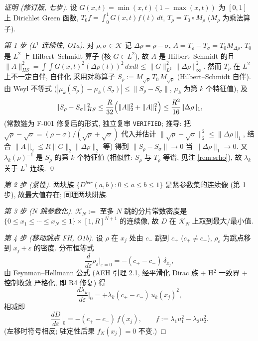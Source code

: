\documentclass[UTF8]{ctexart}
\begin{document}
\begin{proof}[证明 (修订版, 七步)]
设 $G(x,t)=\min(x,t)(1-\max(x,t))$ 为 $[0,1]$ 上 Dirichlet Green 函数,
$T_0 f=\int_0^1 G(x,t)f(t)\,dt$, $T_\rho=T_0\circ M_\rho$ ($M_\rho$ 为乘法算子).

\emph{第 1 步 (L$^1$ 连续性, O1a).} 对 $\rho,\sigma\in\mathcal K$ 记
$\Delta\rho=\rho-\sigma$, $A=T_\rho-T_\sigma=T_0M_{\Delta\rho}$. $T_0$ 是 $L^2$ 上
Hilbert--Schmidt 算子 (核 $G\in L^2$), 故 $A$ 是 Hilbert--Schmidt 的且
$\|A\|_{HS}^2=\int\!\!\int G(x,t)^2(\Delta\rho(t))^2\,dxdt\le
\|G\|_{L^2}^2\|\Delta\rho\|_\infty^2$. 然而 $T_\rho$ 在 $L^2$ 上不一定自伴, 自伴化
采用对称算子 $S_\rho:=M_{\sqrt\rho}\,T_0\,M_{\sqrt\rho}$ (Hilbert--Schmidt 自伴).
由 Weyl 不等式 ($|\mu_k(S_\rho)-\mu_k(S_\sigma)|\le\|S_\rho-S_\sigma\|$, $\mu_k$ 为第
$k$ 个特征值), 及
\begin{equation}
	\|S_\rho-S_\sigma\|_{HS}^2\le
	\frac{R}{32}\Bigl(\|A\|_2^2+\|A\|_1^2\Bigr)\le\frac{R^2}{16}\|\Delta\rho\|_1,
\end{equation}
(常数链为 F-001 修复后的形式, 独立复审 \texttt{VERIFIED}; 推导: 把
$\sqrt\rho-\sqrt\sigma=(\rho-\sigma)/(\sqrt\rho+\sqrt\sigma)$ 代入并估计
$\|\sqrt\rho-\sqrt\sigma\|_2^2\le\|\Delta\rho\|_1$, 结合 $\|A\|_2\le R\|G\|_2\|\Delta\rho\|_2$
等) 得到 $\|S_\rho-S_\sigma\|\to 0$ 当 $\|\Delta\rho\|_1\to0$. 又 $\lambda_k(\rho)^{-1}$
是 $S_\rho$ 的第 $k$ 个特征值 (相似性: $S_\rho$ 与 $T_\rho$ 等谱, 见注 \ref{rem:srho}),
故 $\lambda_k$ 关于 $L^1$ 连续. \qed

\emph{第 2 步 (紧性).} 两块族 $\{D^{bar}(a,b):0\le a\le b\le1\}$ 是紧参数集的连续像
(第 1 步), 故最大值存在; 同理两块阱族.

\emph{第 3 步 ($N$ 跳参数化).} $\mathcal K_N:=$ 至多 $N$ 跳的分片常数密度是
$\{0\le x_1\le\cdots\le x_N\le1\}\times[1,R]^{N+1}$ 的连续像, 故 $D$ 在 $\mathcal K_N$
上取到最大/最小值.

\emph{第 4 步 (移动跳点 FH, O1b).} 设 $\rho$ 在 $x_j$ 处由 $c_-$ 跳到 $c_+$
($c_+\neq c_-$), $\rho_\varepsilon$ 为跳点移到 $x_j+\varepsilon$ 的密度. 分布恒等式
\begin{equation}
	\frac{d}{d\varepsilon}\rho_\varepsilon\Big|_{\varepsilon=0}
	=-(c_+-c_-)\,\delta_{x_j},
\end{equation}
由 Feynman--Hellmann 公式 (AEH 引理 2.1, 经平滑化 Dirac 族 + H$^2$ 一致界 + 控制收敛
严格化, 即 R4 修复) 得
\begin{equation}
	\frac{d\lambda_k}{d\varepsilon}\Big|_0
	=+\lambda_k(c_+-c_-)\,u_k(x_j)^2,
\end{equation}
相减即
\begin{equation}
	\frac{dD}{d\varepsilon}\Big|_0=-(c_+-c_-)\,f(x_j),\qquad
	f:=\lambda_1u_1^2-\lambda_2u_2^2.
\end{equation}
(左移时符号相反; 驻定性后果 $f_N(x_j)=0$ 不变.)


\end{proof}
\end{document}
